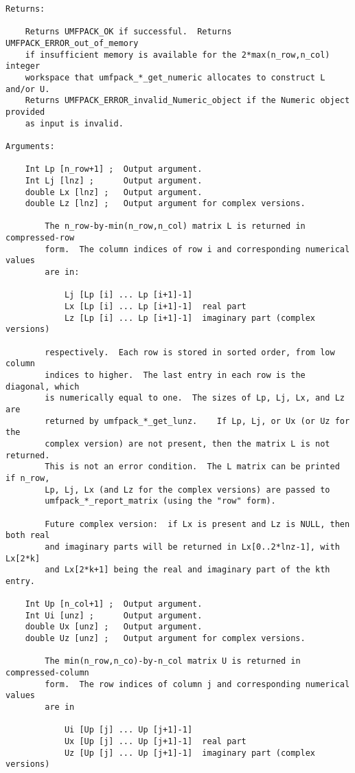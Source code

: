 {\begin{verbatim}
Returns:

    Returns UMFPACK_OK if successful.  Returns UMFPACK_ERROR_out_of_memory
    if insufficient memory is available for the 2*max(n_row,n_col) integer
    workspace that umfpack_*_get_numeric allocates to construct L and/or U.
    Returns UMFPACK_ERROR_invalid_Numeric_object if the Numeric object provided
    as input is invalid.

Arguments:

    Int Lp [n_row+1] ;  Output argument.
    Int Lj [lnz] ;      Output argument.
    double Lx [lnz] ;   Output argument.
    double Lz [lnz] ;   Output argument for complex versions.

        The n_row-by-min(n_row,n_col) matrix L is returned in compressed-row
        form.  The column indices of row i and corresponding numerical values
        are in:

            Lj [Lp [i] ... Lp [i+1]-1]
            Lx [Lp [i] ... Lp [i+1]-1]  real part
            Lz [Lp [i] ... Lp [i+1]-1]  imaginary part (complex versions)

        respectively.  Each row is stored in sorted order, from low column
        indices to higher.  The last entry in each row is the diagonal, which
        is numerically equal to one.  The sizes of Lp, Lj, Lx, and Lz are
        returned by umfpack_*_get_lunz.    If Lp, Lj, or Ux (or Uz for the
        complex version) are not present, then the matrix L is not returned.
        This is not an error condition.  The L matrix can be printed if n_row,
        Lp, Lj, Lx (and Lz for the complex versions) are passed to
        umfpack_*_report_matrix (using the "row" form).

        Future complex version:  if Lx is present and Lz is NULL, then both real
        and imaginary parts will be returned in Lx[0..2*lnz-1], with Lx[2*k]
        and Lx[2*k+1] being the real and imaginary part of the kth entry.

    Int Up [n_col+1] ;  Output argument.
    Int Ui [unz] ;      Output argument.
    double Ux [unz] ;   Output argument.
    double Uz [unz] ;   Output argument for complex versions.

        The min(n_row,n_co)-by-n_col matrix U is returned in compressed-column
        form.  The row indices of column j and corresponding numerical values
        are in

            Ui [Up [j] ... Up [j+1]-1]
            Ux [Up [j] ... Up [j+1]-1]  real part
            Uz [Up [j] ... Up [j+1]-1]  imaginary part (complex versions)


\end{verbatim}}
